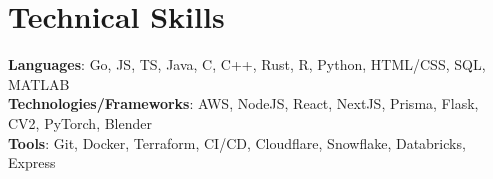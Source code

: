 \documentclass[letterpaper,11pt]{article}
\makeatletter
\newcommand{\resumeItem}[1]{
  \item\small{
    {#1 \vspace{-2pt}}
  }
}
\newcommand{\resumeSubheading}[4]{
  \vspace{-2pt}\item
    \begin{tabular*}{1.0\textwidth}[t]{l@{\extracolsep{\fill}}r}
      \small#1 & \textbf{\small #2} \\
      \textit{\small#3} & \textit{\small #4} \\
    \end{tabular*}\vspace{-9pt}
}
\newcommand{\resumeSubHeadingListStart}{\begin{itemize}[leftmargin=0.0in, label={}]}
\newcommand{\resumeItemListStart}{\begin{itemize}}
\newcommand{\resumeItemListEnd}{\end{itemize}\vspace{-5pt}}
\makeatother
\begin{document}
\vspace{-17pt}
\section{Technical Skills}
 \begin{itemize}[leftmargin=0.15in, label={}]
    \small{\item{
      \begin{comment}
        Languages:
        - Go
        - JavaScript
        - TypeScript
        - C
        - C++
        - Java
        - Rust
        - R
        - Python
        - HTML/CSS
        - SQL
        - MATLAB

        Technologies/Frameworks:
        - Linux
        - Bootstrap
        - NextJS
        - React
        - Prisma
        - Flask
        - Node
        - CV2
        - AWS
        - PyTorch
        - Blender

        Tools:
        - Git
        - Docker
        - Terraform
        - CI/CD
        - AWS
        - Cloudflare
        - Snowflake
        - Databricks
        - Express
      \end{comment}
      \textbf{Languages}{: Go, JS, TS, Java, C, C++, Rust, R, Python, HTML/CSS, SQL, MATLAB} \\
      \textbf{Technologies/Frameworks}{: AWS, NodeJS, React, NextJS, Prisma, Flask, CV2, PyTorch, Blender} \\
      \textbf{Tools}{: Git, Docker, Terraform, CI/CD, Cloudflare, Snowflake, Databricks, Express} \\
    }}
 \end{itemize}
\vspace{-15pt}


        
\end{document}
